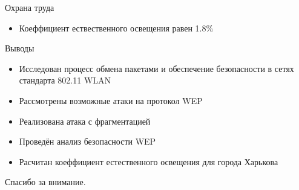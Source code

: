 \documentclass[12pt]{beamer}
\begin{document}
\begin{frame}{Охрана труда}

\begin{itemize}
    \item Коеффициент ествественного освещения равен 1.8\%
\end{itemize}

\end{frame} 


\begin{frame}{Выводы}

\begin{itemize}
    \item Исследован процесс обмена пакетами и обеспечение безопасности в сетях стандарта 802.11 WLAN
    \item Рассмотрены возможные атаки на протокол WEP
    \item Реализована атака с фрагментацией
    \item Проведён анализ безопасности WEP
    \item Расчитан коеффициент естественного освещения для города Харькова
\end{itemize}

\end{frame} 


\begin{frame}{}

\begin{center}
    Спасибо за внимание.
\end{center}

\end{frame}
\end{document}
